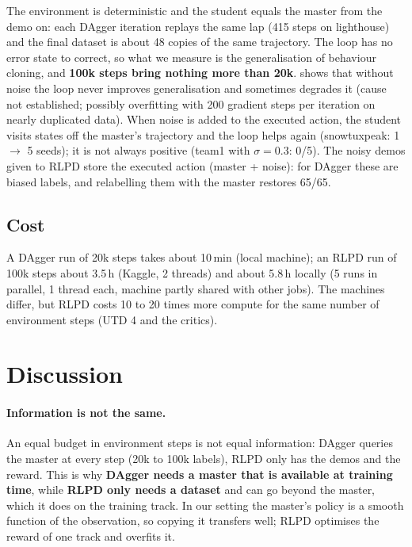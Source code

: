 \documentclass[10pt,a4paper]{article}
\begin{document}
The environment is deterministic and the student equals the master from the demo on: each DAgger iteration replays the same lap (415 steps on lighthouse) and the final dataset is about 48 copies of the same trajectory.
The loop has no error state to correct, so what we measure is the generalisation of behaviour cloning, and \textbf{100k steps bring nothing more than 20k}.
 shows that without noise the loop never improves generalisation and sometimes degrades it (cause not established; possibly overfitting with 200 gradient steps per iteration on nearly duplicated data).
When noise is added to the executed action, the student visits states off the master's trajectory and the loop helps again (snowtuxpeak: 1 $\to$ 5 seeds); it is not always positive (team1 with $\sigma=0.3$: 0/5).
The noisy demos given to RLPD store the executed action (master + noise): for DAgger these are biased labels, and relabelling them with the master restores 65/65.

\subsection{Cost}
A DAgger run of 20k steps takes about 10\,min (local machine); an RLPD run of 100k steps about 3.5\,h (Kaggle, 2 threads) and about 5.8\,h locally (5 runs in parallel, 1 thread each, machine partly shared with other jobs). The machines differ, but RLPD costs 10 to 20 times more compute for the same number of environment steps (UTD 4 and the critics).

\section{Discussion}
\label{sec:discussion}

\paragraph{Information is not the same.}
An equal budget in environment steps is not equal information: DAgger queries the master at every step (20k to 100k labels), RLPD only has the demos and the reward.
This is why \textbf{DAgger needs a master that is available at training time}, while \textbf{RLPD only needs a dataset} and can go beyond the master, which it does on the training track.
In our setting the master's policy is a smooth function of the observation, so copying it transfers well; RLPD optimises the reward of one track and overfits it.
\end{document}
